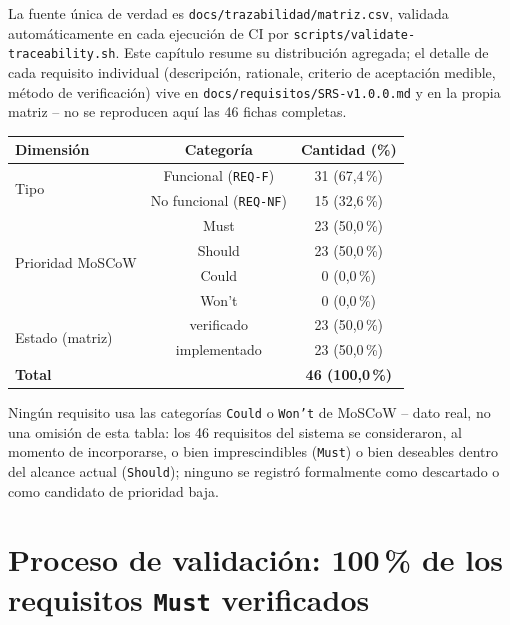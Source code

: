 La fuente única de verdad es \texttt{docs/trazabilidad/matriz.csv},
validada automáticamente en cada ejecución de CI por
\texttt{scripts/validate-traceability.sh}. Este capítulo resume su
distribución agregada; el detalle de cada requisito individual
(descripción, rationale, criterio de aceptación medible, método de
verificación) vive en \texttt{docs/requisitos/SRS-v1.0.0.md} y en la
propia matriz -- no se reproducen aquí las 46 fichas completas.

\begin{center}
\begin{tabular}{|l|c|c|}
\hline
\rowcolor{verdeuteq}
\color{white}\textbf{Dimensión} & \color{white}\textbf{Categoría} & \color{white}\textbf{Cantidad (\%)} \\
\hline
\multirow{2}{*}{Tipo} & Funcional (\texttt{REQ-F}) & 31 (67{,}4\,\%) \\
 & No funcional (\texttt{REQ-NF}) & 15 (32{,}6\,\%) \\
\hline
\multirow{4}{*}{Prioridad MoSCoW} & Must & 23 (50{,}0\,\%) \\
 & Should & 23 (50{,}0\,\%) \\
 & Could & 0 (0{,}0\,\%) \\
 & Won't & 0 (0{,}0\,\%) \\
\hline
\multirow{2}{*}{Estado (matriz)} & verificado & 23 (50{,}0\,\%) \\
 & implementado & 23 (50{,}0\,\%) \\
\hline
\textbf{Total} & & \textbf{46 (100{,}0\,\%)} \\
\hline
\end{tabular}
\end{center}

Ningún requisito usa las categorías \texttt{Could} o \texttt{Won't} de
MoSCoW -- dato real, no una omisión de esta tabla: los 46 requisitos del
sistema se consideraron, al momento de incorporarse, o bien
imprescindibles (\texttt{Must}) o bien deseables dentro del alcance
actual (\texttt{Should}); ninguno se registró formalmente como
descartado o como candidato de prioridad baja.

\section{Proceso de validación: 100\,\% de los requisitos \texttt{Must} verificados}


